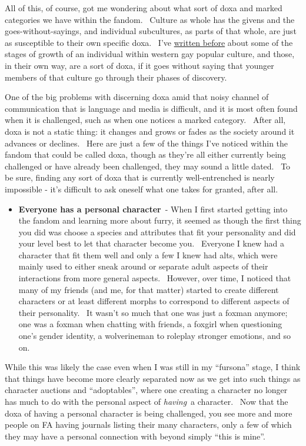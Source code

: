 All of this, of course, got me wondering about what sort of doxa and
marked categories we have within the fandom. ~Culture as whole has the
givens and the goes-without-sayings, and individual subcultures, as
parts of that whole, are just as susceptible to their own specific doxa.
~I've
\href{http://adjectivespecies.com/2012/02/01/eighty-twenty/}{written
before} about some of the stages of growth of an individual within
western gay popular culture, and those, in their own way, are a sort of
doxa, if it goes without saying that younger members of that culture go
through their phases of discovery.

One of the big problems with discerning doxa amid that noisy channel of
communication that is language and media is difficult, and it is most
often found when it is challenged, such as when one notices a marked
category. ~After all, doxa is not a static thing: it changes and grows
or fades as the society around it advances or declines. ~Here are just a
few of the things I've noticed within the fandom that could be called
doxa, though as they're all either currently being challenged or have
already been challenged, they may sound a little dated. ~To be sure,
finding any sort of doxa that is currently well-entrenched is nearly
impossible - it's difficult to ask oneself what one takes for granted,
after all.

\begin{itemize}
\tightlist
\item
  \textbf{Everyone has a personal character}~- When I first started
  getting into the fandom and learning more about furry, it seemed as
  though the first thing you did was choose a species and attributes
  that fit your personality and did your level best to let that
  character become you. ~Everyone I knew had a character that fit them
  well and only a few I knew had alts, which were mainly used to either
  sneak around or separate adult aspects of their interactions from more
  general aspects. ~However, over time, I noticed that many of my
  friends (and me, for that matter) started to create different
  characters or at least different morphs to correspond to different
  aspects of their personality. ~It wasn't so much that one was just a
  foxman anymore; one was a foxman when chatting with friends, a foxgirl
  when questioning one's gender identity, a wolverineman to roleplay
  stronger emotions, and so on.
\end{itemize}

While this was likely the case even when I was still in my ``fursona''
stage, I think that things have become more clearly separated now as we
get into such things as character auctions and ``adoptables'', where one
creating a character no longer has much to do with the personal aspect
of \emph{having}~a character. ~Now that the doxa of having a personal
character is being challenged, you see more and more people on FA having
journals listing their many characters, only a few of which they may
have a personal connection with beyond simply ``this is mine''.

